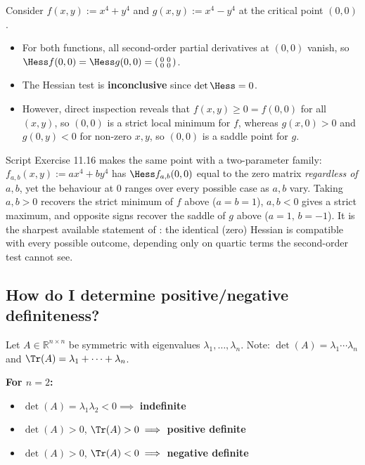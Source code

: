 \begin{aiexample}
Consider $f(x,y) := x^4 + y^4$ and $g(x,y) := x^4 - y^4$ at the critical point $(0,0)$.
\begin{itemize}
  \item For both functions, all second-order partial derivatives at $(0,0)$ vanish, so $\Hess f(0,0) = \Hess g(0,0) = \left(\begin{smallmatrix} 0 & 0 \\ 0 & 0 \end{smallmatrix}\right)$.
  \item The Hessian test is \textbf{inconclusive} since $\det \Hess = 0$.
  \item However, direct inspection reveals that $f(x,y) \geq 0 = f(0,0)$ for all $(x,y)$, so $(0,0)$ is a strict local minimum for $f$, whereas $g(x,0) > 0$ and $g(0,y) < 0$ for non-zero $x,y$, so $(0,0)$ is a saddle point for $g$.
\end{itemize}
\end{aiexample}

\begin{remark}
Script Exercise 11.16 makes the same point with a two-parameter family:
$f_{a,b}(x,y) := ax^4+by^4$ has $\Hess f_{a,b}(0,0)$ equal to the zero matrix \emph{regardless of
$a,b$}, yet the behaviour at $0$ ranges over every possible case as $a,b$ vary. Taking $a,b>0$
recovers the strict minimum of $f$ above ($a=b=1$), $a,b<0$ gives a strict maximum, and opposite
signs recover the saddle of $g$ above ($a=1,\,b=-1$). It is the sharpest available statement of
: the identical (zero) Hessian is compatible with
every possible outcome, depending only on quartic terms the second-order test cannot see.
\end{remark}

\subsection{How do I determine positive/negative definiteness?}

Let $A \in \mathbb{R}^{n\times n}$ be symmetric with eigenvalues $\lambda_1,\dots,\lambda_n$.
Note: $\det(A) = \lambda_1\cdots\lambda_n$ and $\Tr(A) = \lambda_1+\dots+\lambda_n$.

\textbf{For $n = 2$:}
\begin{itemize}
  \item $\det(A) = \lambda_1\lambda_2 < 0 \implies$ \textbf{indefinite}
  \item $\det(A) > 0$, $\Tr(A) > 0 \implies$ \textbf{positive definite}
  \item $\det(A) > 0$, $\Tr(A) < 0 \implies$ \textbf{negative definite}
\end{itemize}

